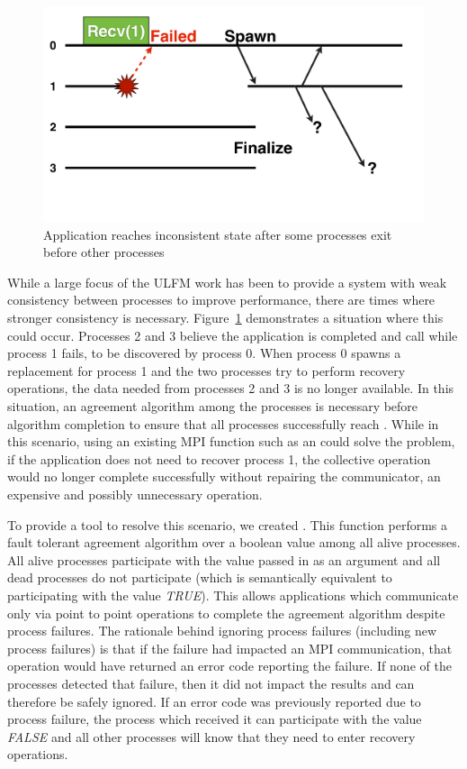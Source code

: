 \begin{figure}[t]
    \centering
    \includegraphics[width=\linewidth]{figures/NoAgree}
    \caption{Application reaches inconsistent state after some processes exit
             before other processes}
    \label{fig:ulfm:NoAgree}
\end{figure}

While a large focus of the ULFM work has been to provide a system with weak
consistency between processes to improve performance, there are times where
stronger consistency is necessary. Figure~\ref{fig:ulfm:NoAgree} demonstrates a
situation where this could occur. Processes 2 and 3 believe the application is
completed and call  while process 1 fails, to be
discovered by process 0. When process 0 spawns a replacement for process 1 and
the two processes try to perform recovery operations, the data needed from
processes 2 and 3 is no longer available. In this situation, an agreement
algorithm among the processes is necessary before algorithm completion to ensure 
that all processes successfully reach . While in this scenario, using an
existing MPI function such as an  could solve the
problem, if the application does not need to recover process 1, the collective
operation would no longer complete successfully without repairing the
communicator, an expensive and possibly unnecessary operation.

To provide a tool to resolve this scenario, we created
. This function performs a fault tolerant agreement
algorithm over a boolean value among all alive processes. All alive processes
participate with the value passed in as an argument and all dead processes do
not participate (which is semantically equivalent to participating with the
value \textit{TRUE}). This allows applications which communicate only via point
to point operations to complete the agreement algorithm despite process
failures. The rationale behind ignoring process failures (including new process 
failures) is that if the failure
had impacted an MPI communication, that operation would have returned
an error code reporting the failure. If none of the processes detected that
failure, then it did not impact the results and can therefore be safely ignored.
If an error code was previously reported due to process failure, the process 
which received it can participate with the value \textit{FALSE} and all other 
processes will know that they need to enter recovery operations.

